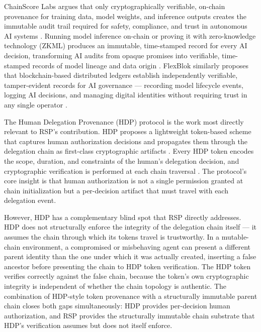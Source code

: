 ChainScore Labs argues that only cryptographically verifiable, on-chain provenance for training data, model weights, and inference outputs creates the immutable audit trail required for safety, compliance, and trust in autonomous AI systems \cite{on_chain_provenance_ai}. Running model inference on-chain or proving it with zero-knowledge technology (ZKML) produces an immutable, time-stamped record for every AI decision, transforming AI audits from opaque promises into verifiable, time-stamped records of model lineage and data origin \cite{on_chain_provenance_ai}. FlexBlok similarly proposes that blockchain-based distributed ledgers establish independently verifiable, tamper-evident records for AI governance — recording model lifecycle events, logging AI decisions, and managing digital identities without requiring trust in any single operator \cite{blockchain_ai_governance}.

The Human Delegation Provenance (HDP) protocol is the work most directly relevant to RSP's contribution. HDP proposes a lightweight token-based scheme that captures human authorization decisions and propagates them through the delegation chain as first-class cryptographic artifacts \cite{hdp2025arxiv}. Every HDP token encodes the scope, duration, and constraints of the human's delegation decision, and cryptographic verification is performed at each chain traversal \cite{hdp2025ietf}. The protocol's core insight is that human authorization is not a single permission granted at chain initialization but a per-decision artifact that must travel with each delegation event.

However, HDP has a complementary blind spot that RSP directly addresses. HDP does not structurally enforce the integrity of the delegation chain itself — it assumes the chain through which its tokens travel is trustworthy. In a mutable-chain environment, a compromised or misbehaving agent can present a different parent identity than the one under which it was actually created, inserting a false ancestor before presenting the chain to HDP token verification. The HDP token verifies correctly against the false chain, because the token's own cryptographic integrity is independent of whether the chain topology is authentic. The combination of HDP-style token provenance with a structurally immutable parent chain closes both gaps simultaneously: HDP provides per-decision human authorization, and RSP provides the structurally immutable chain substrate that HDP's verification assumes but does not itself enforce.

